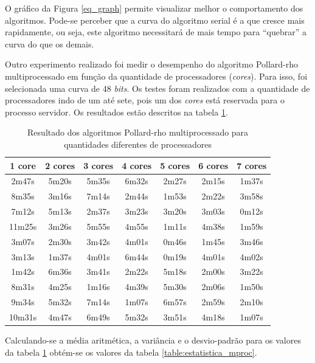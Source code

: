 O gráfico da Figura \ref{eq_graph} permite visualizar melhor o comportamento dos algoritmos. Pode-se perceber que a curva do algoritmo serial é a que cresce mais rapidamente, ou seja, este algoritmo necessitará de mais tempo para ``quebrar'' a curva do que os demais.

Outro experimento realizado foi medir o desempenho do algoritmo Pollard-rho multiprocessado em função da quantidade de processadores (\textit{cores}). Para isso, foi selecionada uma curva de 48 \textit{bits}. Os testes foram realizados com a quantidade de processadores indo de um até sete, pois um dos \textit{cores} está reservada para o processo servidor. Os resultados estão descritos na tabela \ref{table:results_mproc}.

\begin{table}[h]
\centering
\begin{tabular}{|c|c|c|c|c|c|c|}
\hline
\rowcolor[gray]{0.9}
\textbf{1 core}  & \textbf{2 cores} & \textbf{3 cores} & \textbf{4 cores} & \textbf{5 cores} & \textbf{6 cores} & \textbf{7 cores} \\ \hline
2m47s    & 5m20s   & 5m35s   & 6m32s   & 2m27s   & 2m15s   & 1m37s   \\ \hline
8m35s    & 3m16s   & 7m14s   & 2m44s   & 1m53s   & 2m22s   & 3m58s   \\ \hline
7m12s    & 5m13s   & 2m37s   & 3m23s   & 3m20s   & 3m03s   & 0m12s   \\ \hline
11m25s   & 3m26s   & 5m55s   & 4m55s   & 1m11s   & 4m38s   & 1m59s   \\ \hline
3m07s    & 2m30s   & 3m42s   & 4m01s   & 0m46s   & 1m45s   & 3m46s   \\ \hline
3m13s    & 1m37s   & 4m01s   & 6m44s   & 0m19s   & 4m01s   & 4m02s   \\ \hline
1m42s    & 6m36s   & 3m41s   & 2m22s   & 5m18s   & 2m00s   & 3m22s   \\ \hline
8m31s    & 4m25s   & 1m16s   & 4m39s   & 5m30s   & 2m06s   & 1m50s   \\ \hline
9m34s    & 5m32s   & 7m14s   & 1m07s   & 6m57s   & 2m59s   & 2m10s   \\ \hline
10m31s   & 4m47s   & 6m49s   & 5m32s   & 3m51s   & 4m18s   & 1m07s   \\ \hline
\end{tabular}
\caption{Resultado dos algoritmos Pollard-rho multiprocessado para quantidades diferentes de processadores}
\label{table:results_mproc}
\end{table}

Calculando-se a média aritmética, a variância e o desvio-padrão para os valores da tabela \ref{table:results_mproc} obtém-se os valores da tabela \ref{table:estatistica_mproc}.

